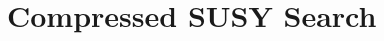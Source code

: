 
\setcounter{secnumdepth}{3}
\setcounter{tocdepth}{3}
\setlength{\parskip}{\smallskipamount}
\setlength{\parindent}{0pt}


\makeatletter


\providecommand{\tabularnewline}{\\}


\makeatother

%

\chapter{Compressed SUSY Search}


